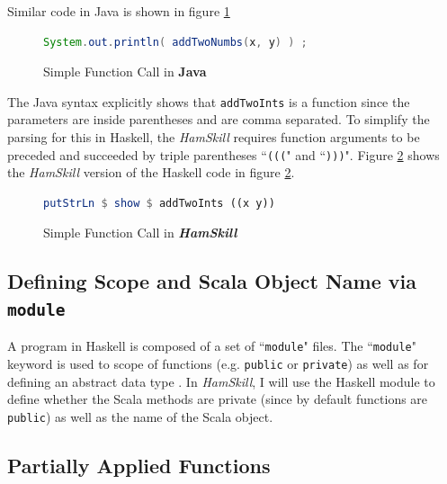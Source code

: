 \documentclass{report}
\begin{document}
Similar code in Java is shown in figure \ref{fig:addTwoNumbersJava}

\begin{figure}[H]
\begin{mdframed}
\begin{lstlisting}[language=Java]
System.out.println( addTwoNumbs(x, y) ) ;
\end{lstlisting}
\end{mdframed}
\caption{Simple Function Call in \textbf{Java}}\label{fig:addTwoNumbersJava}
\end{figure}

The Java syntax explicitly shows that {\tt addTwoInts} is a function since the parameters are inside parentheses and are comma separated.  To simplify the parsing for this in Haskell, the \emph{HamSkill} requires function arguments to be preceded and succeeded by triple parentheses ``\texttt{(((}" and ``\texttt{)))}".  Figure \ref{fig:addTwoNumbersHamSkill} shows the \emph{HamSkill} version of the Haskell code in figure \ref{fig:addTwoNumbersHamSkill}.

\begin{figure}[H]
\begin{mdframed}
\begin{lstlisting}[language=Haskell]
putStrLn $ show $ addTwoInts ((x y))
\end{lstlisting}
\end{mdframed}
\caption{Simple Function Call in \textbf{\emph{HamSkill}}}\label{fig:addTwoNumbersHamSkill}
\end{figure}

\subsection{Defining Scope and Scala Object Name via {\tt module}}

A program in Haskell is composed of a set of ``{\tt module}" files.  The ``{\tt module}" keyword is used to  scope of functions (e.g. {\tt public} or {\tt private}) as well as for defining an abstract data type \cite{haskellModule}.  In \emph{HamSkill}, I will use the Haskell module to define whether the Scala methods are private (since by default functions are {\tt public}) as well as the name of the Scala object.

\subsection{Partially Applied Functions}\label{sec:partiallyAppliedFunctions}
\end{document}
